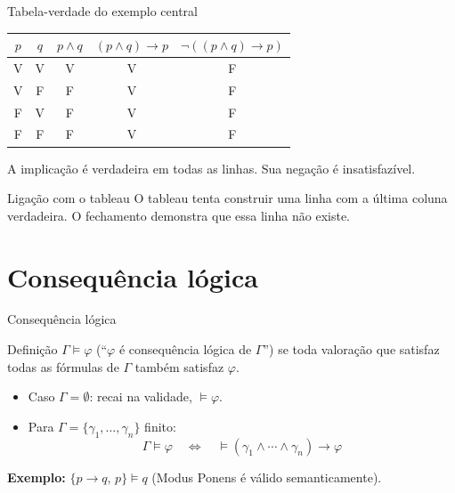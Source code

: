 \documentclass[10pt,aspectratio=169]{beamer}
\newcommand{\dest}[1]{\alert{#1}}
\begin{document}
\begin{frame}{Tabela-verdade do exemplo central}

\begin{center}
\renewcommand{\arraystretch}{1.45}
\begin{tabular}{cc|c|c|c}
\toprule
$p$&$q$&$p\land q$&$(p\land q)\to p$&$\neg((p\land q)\to p)$\\\midrule
V&V&V&V&F\\
V&F&F&V&F\\
F&V&F&V&F\\
F&F&F&V&F\\\bottomrule
\end{tabular}\par
\end{center}
A implicação é verdadeira em todas as linhas. Sua negação é insatisfazível.
\begin{block}{Ligação com o tableau}
O tableau tenta construir uma linha com a última coluna verdadeira.
O fechamento demonstra que essa linha não existe.
\end{block}
\end{frame}

\section{Consequência lógica}
\begin{frame}{Consequência lógica}
  \begin{block}{Definição}
    $\Gamma \models \varphi$ (``$\varphi$ é consequência lógica de $\Gamma$'') se \dest{toda} valoração que satisfaz todas as fórmulas de $\Gamma$ também satisfaz $\varphi$.
  \end{block}
  \begin{itemize}
    \item Caso $\Gamma=\emptyset$: recai na validade, $\models\varphi$.
    \item Para $\Gamma=\{\gamma_1,\dots,\gamma_n\}$ finito:
    \[
      \Gamma\models\varphi \quad\Longleftrightarrow\quad \models (\gamma_1\land\cdots\land\gamma_n)\rightarrow\varphi
    \]
  \end{itemize}
  \textbf{Exemplo:} $\{p\rightarrow q,\, p\}\models q$ (Modus Ponens é válido semanticamente).
\end{frame}

\end{document}
